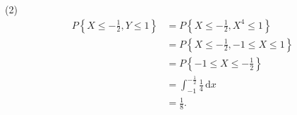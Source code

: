 \documentclass{article}
\begin{document}
\begin{solution}
$$    $$
    (2)
    $$
        \begin{aligned}
            P\left\{X \leqslant -\frac{1}{2}, Y \leqslant 1\right\}
             & = P\left\{X \leqslant -\frac{1}{2}, X^4 \leqslant 1\right\}            \\
             & = P\left\{X \leqslant -\frac{1}{2}, -1 \leqslant X \leqslant 1\right\} \\
             & = P\left\{-1 \leqslant X \leqslant -\frac{1}{2}\right\}                \\
             & = \int_{-1}^{-\frac{1}{2}} \frac{1}{4} \,\mathrm{d}x                   \\
             & = \frac{1}{8}.                                                         \\
        \end{aligned}
    $$
\end{solution}
\end{document}
